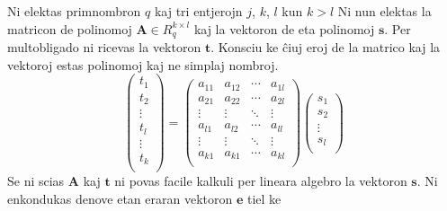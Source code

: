 \documentclass[utf8]{scrartcl}
\begin{document}
Ni elektas primnombron $q$ kaj tri entjerojn $j$, $k$, $l$ kun $k>l$ Ni nun
elektas la matricon de polinomoj $\mathbf{A} \in R_q^{k\times l}$ kaj la
vektoron de eta polinomoj $\mathbf{s}$. Per multobligado ni ricevas la vektoron
$\mathbf{t}$. Konsciu ke ĉiuj eroj de la matrico kaj la vektoroj estas
polinomoj kaj ne simplaj nombroj.
\[
  \begin{pmatrix}
    t_1 \\ t_2 \\ \vdots \\ t_l \\ \vdots \\ t_k \\
  \end{pmatrix}
  =
  \begin{pmatrix}
    a_{11} & a_{12} & \cdots & a_{1l} \\
    a_{21} & a_{22} & \cdots & a_{2l} \\
    \vdots & \vdots & \ddots & \vdots \\
    a_{l1} & a_{l2} & \cdots & a_{ll} \\
    \vdots & \vdots & \ddots & \vdots \\
    a_{k1} & a_{k1} & \cdots & a_{kl} \\
  \end{pmatrix}
  \begin{pmatrix}
    s_1 \\ s_2 \\ \vdots \\ s_l \\
  \end{pmatrix}
\]
%
Se ni scias $\mathbf{A}$ kaj $\mathbf{t}$ ni povas facile kalkuli per lineara
algebro la vektoron $\mathbf{s}$. Ni enkondukas denove etan eraran vektoron
$\mathbf{e}$ tiel ke
\end{document}
